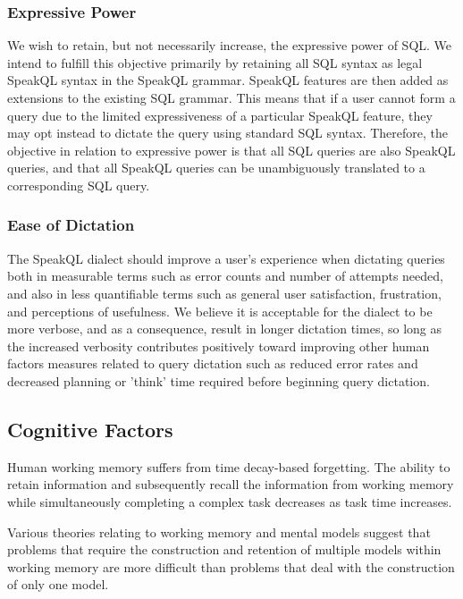 \subsubsection{Expressive Power} 

We wish to retain, but not necessarily increase, the expressive power of SQL. We intend to fulfill this objective primarily by retaining all SQL syntax as legal SpeakQL syntax in the SpeakQL grammar. SpeakQL features are then added as extensions to the existing SQL grammar. This means that if a user cannot form a query due to the limited expressiveness of a particular SpeakQL feature, they may opt instead to dictate the query using standard SQL syntax. Therefore, the objective in relation to expressive power is that all SQL queries are also SpeakQL queries, and that all SpeakQL queries can be unambiguously translated to a corresponding SQL query.

\subsubsection{Ease of Dictation}

The SpeakQL dialect should improve a user's experience when dictating queries both in measurable terms such as error counts and number of attempts needed, and also in less quantifiable terms such as general user satisfaction, frustration, and perceptions of usefulness. We believe it is acceptable for the dialect to be more verbose, and as a consequence, result in longer dictation times, so long as the increased verbosity contributes positively toward improving other human factors measures related to query dictation such as reduced error rates and decreased planning or 'think' time required before beginning query dictation.

\subsection{Cognitive Factors}
Human working memory suffers from time decay-based forgetting. The ability to retain information 
and subsequently recall the information from working memory while simultaneously completing a complex task decreases
as task time increases. \cite{Towse1995} 

Various theories relating to working memory and mental models suggest that problems that require the construction
and retention of multiple models within working memory are more difficult than problems that deal with the construction
of only one model. \cite{Vandierendonck1997}

